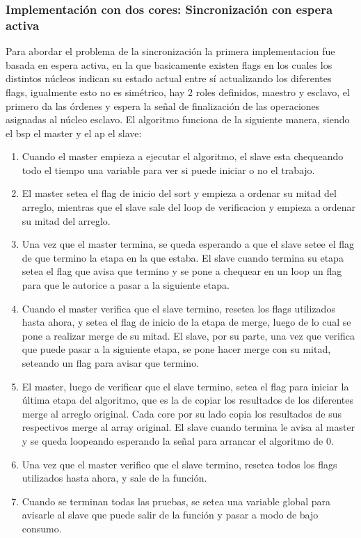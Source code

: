     \subsubsection{Implementación con dos cores: Sincronización con espera activa}
    	Para abordar el problema de la sincronización la primera implementacion fue basada en espera activa, en la que basicamente existen flags en los cuales los distintos núcleos indican su estado actual entre sí actualizando los diferentes flags, igualmente esto no es simétrico, hay 2 roles definidos, maestro y esclavo, el primero da las órdenes y espera la señal de finalización de las operaciones asignadas al núcleo esclavo.
    	El algoritmo funciona de la siguiente manera, siendo el bsp el master y el ap el slave:
    	\begin{enumerate}
    		\item Cuando el master empieza a ejecutar el algoritmo, el slave esta chequeando todo el tiempo una variable para ver si puede iniciar o no el trabajo.
    		
    		\item El master setea el flag de inicio del sort y empieza a ordenar su mitad del arreglo, mientras que el slave sale del loop de verificacion y empieza a ordenar su mitad del arreglo.
    		
    		\item Una vez que el master termina, se queda esperando a que el slave setee el flag de que termino la etapa en la que estaba. El slave cuando termina su etapa setea el flag que avisa que termino y se pone a chequear en un loop un flag para que le autorice a pasar a la siguiente etapa.

    		\item Cuando el master verifica que el slave termino, resetea los flags utilizados hasta ahora, y setea el flag de inicio de la etapa de merge, luego de lo cual se pone a realizar merge de su mitad. El slave, por su parte, una vez que verifica que puede pasar a la siguiente etapa, se pone hacer merge con su mitad, seteando un flag para avisar que termino.

    		\item El master, luego de verificar que el slave termino, setea el flag para iniciar la última etapa del algoritmo, que es la de copiar los resultados de los diferentes merge al arreglo original. Cada core por su lado copia los resultados de sus respectivos merge al array original. El slave cuando termina le avisa al master y se queda loopeando esperando la señal para arrancar el algoritmo de 0.

    		\item Una vez que el master verifico que el slave termino, resetea todos los flags utilizados hasta ahora, y sale de la función.

			\item Cuando se terminan todas las pruebas, se setea una variable global para avisarle al slave que puede salir de la función y pasar a modo de bajo consumo.
    	\end{enumerate}

